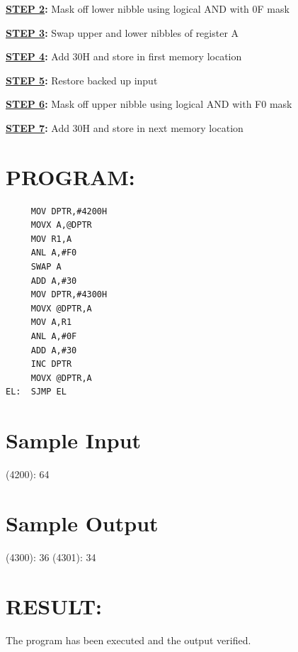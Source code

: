 \documentclass[a4paper,28pt]{report}
\begin{document}
\textbf{\underline{STEP 2}:} Mask off lower nibble using logical AND with 0F mask

\textbf{\underline{STEP 3}:} Swap upper and lower nibbles of register A

\textbf{\underline{STEP 4}:} Add 30H and store in first memory location

\textbf{\underline{STEP 5}:} Restore backed up input

\textbf{\underline{STEP 6}:} Mask off upper nibble using logical AND with F0 mask

\textbf{\underline{STEP 7}:} Add 30H and store in next memory location

\section*{PROGRAM:}

\begin{lstlisting}
     MOV DPTR,#4200H
     MOVX A,@DPTR
     MOV R1,A 
     ANL A,#F0
     SWAP A 
     ADD A,#30
     MOV DPTR,#4300H
     MOVX @DPTR,A 
     MOV A,R1
     ANL A,#0F
     ADD A,#30
     INC DPTR
     MOVX @DPTR,A
EL:  SJMP EL
\end{lstlisting}

\section*{Sample Input}
(4200): 64
\section*{Sample Output}
(4300): 36 
(4301): 34 

\section*{RESULT:}
The program has been executed and the output verified.
%
%
\end{document}
